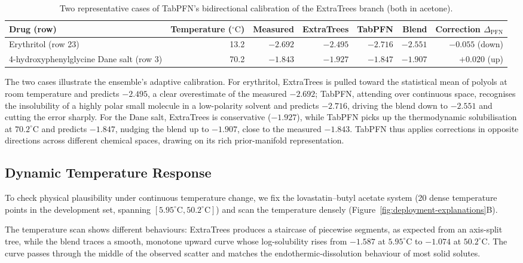 \begin{table}[htbp]
\centering\small
\setlength{\tabcolsep}{4pt}
\caption{Two representative cases of TabPFN's bidirectional calibration of the ExtraTrees branch (both in acetone).}
\label{tab:deployment-examples}
\begin{tabular}{lrrrrrr}
\toprule
Drug (row) & Temperature ($^\circ\text{C}$) & Measured & ExtraTrees & TabPFN & Blend & Correction $\Delta_{\mathrm{PFN}}$ \\
\midrule
Erythritol (row 23) & 13.2 & $-2.692$ & $-2.495$ & $-2.716$ & $-2.551$ & $-0.055$ (down) \\
4-hydroxyphenylglycine Dane salt (row 3) & 70.2 & $-1.843$ & $-1.927$ & $-1.847$ & $-1.907$ & $+0.020$ (up) \\
\bottomrule
\end{tabular}
\end{table}

The two cases illustrate the ensemble's adaptive calibration. For erythritol, ExtraTrees is pulled toward the statistical mean of polyols at room temperature and predicts $-2.495$, a clear overestimate of the measured $-2.692$; TabPFN, attending over continuous space, recognises the insolubility of a highly polar small molecule in a low-polarity solvent and predicts $-2.716$, driving the blend down to $-2.551$ and cutting the error sharply. For the Dane salt, ExtraTrees is conservative ($-1.927$), while TabPFN picks up the thermodynamic solubilisation at $70.2^\circ\text{C}$ and predicts $-1.847$, nudging the blend up to $-1.907$, close to the measured $-1.843$. TabPFN thus applies corrections in opposite directions across different chemical spaces, drawing on its rich prior-manifold representation.

\subsection{Dynamic Temperature Response}

To check physical plausibility under continuous temperature change, we fix the lovastatin--butyl acetate system (20 dense temperature points in the development set, spanning $[5.95^\circ\text{C}, 50.2^\circ\text{C}]$) and scan the temperature densely (Figure~\ref{fig:deployment-explanations}B).

The temperature scan shows different behaviours: ExtraTrees produces a staircase of piecewise segments, as expected from an axis-split tree, while the blend traces a smooth, monotone upward curve whose log-solubility rises from $-1.587$ at $5.95^\circ\text{C}$ to $-1.074$ at $50.2^\circ\text{C}$. The curve passes through the middle of the observed scatter and matches the endothermic-dissolution behaviour of most solid solutes.
